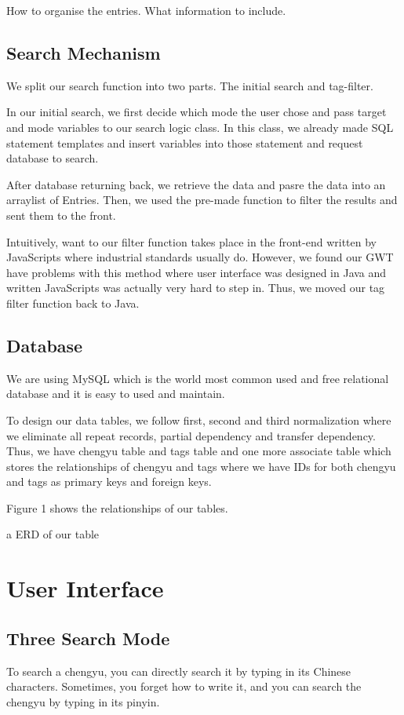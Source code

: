 \documentclass[11pt]{article} %
\begin{document}
\indent How to organise the entries. What information to include. \\

\subsection{Search Mechanism}

\indent We split our search function into two parts. The initial search and tag-filter.

In our initial search, we first decide which mode the user chose and pass target and mode variables to our search logic class. In this class, we already made SQL statement templates and insert variables into those statement and request database to search.

After database returning back, we retrieve the data and pasre the data into an arraylist of Entries. Then, we used the pre-made function to filter the results and sent them to the front.

Intuitively, want to our filter function takes place in the front-end written by JavaScripts where industrial standards usually do. However, we found our GWT have problems with this method where user interface was designed in Java and written JavaScripts was actually very hard to step in. Thus, we moved our tag filter function back to Java. 

\subsection{Database}
\indent We are using MySQL which is the world most common used and free relational database and it is easy to used and maintain.

To design our data tables, we follow first, second and third normalization where we eliminate all repeat records, partial dependency and transfer dependency. Thus, we have chengyu table and tags table and one more associate table which stores the relationships of chengyu and tags where we have IDs for both chengyu and tags as primary keys and foreign keys.

Figure 1 shows the relationships of our tables.

\indent a ERD of our table

\section{User Interface}

\subsection{Three Search Mode}
\indent To search a chengyu, you can directly search it by typing in its Chinese characters. Sometimes, you forget how to write it, and you can search the chengyu by typing in its pinyin.
\end{document}
